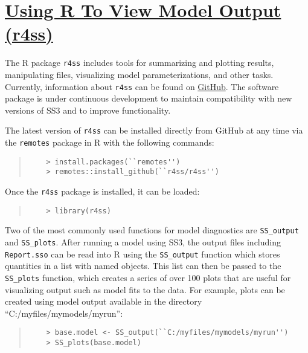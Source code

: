 \section[Using R To View Model Output (r4ss)]{\protect\hyperref[sec:r4ss]{Using R To View Model Output (r4ss)}}\label{sec:r4ss}

The R package \texttt{r4ss} includes tools for summarizing and plotting results, manipulating files, visualizing model parameterizations, and other tasks. Currently, information about \texttt{r4ss} can be found on \href{https://github.com/r4ss/r4ss}{GitHub}.  The software package is under continuous development to maintain compatibility with new versions of SS3 and to improve functionality.

The latest version of \texttt{r4ss} can be installed directly from GitHub at any time via the \texttt{remotes} package in R with the following commands:

\begin{quote}
	\begin{verbatim}
	> install.packages(``remotes'')
	> remotes::install_github(``r4ss/r4ss'')
	\end{verbatim}
\end{quote}

Once the \texttt{r4ss} package is installed, it can be loaded:

\begin{quote}
	\begin{verbatim}
	> library(r4ss)
	\end{verbatim}
\end{quote}

Two of the most commonly used functions for model diagnostics are \texttt{SS\_output} and \texttt{SS\_plots}. After running a model using SS3, the output files including \texttt{Report.sso} can be read into R using the \texttt{SS\_output} function which stores quantities in a list with named objects. This list can then be passed to the \texttt{SS\_plots} function, which creates a series of over 100 plots that are useful for visualizing output such as model fits to the data. For example, plots can be created using model output available in the directory ``C:/myfiles/mymodels/myrun'':

\begin{quote}
	\begin{verbatim}
	> base.model <- SS_output(``C:/myfiles/mymodels/myrun'')
	> SS_plots(base.model)
	\end{verbatim}
\end{quote}
  
